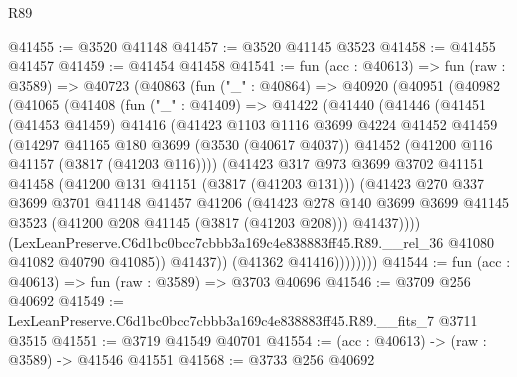 \begin{lexlean}{R89}
\begin{coremodule}
@41455 := @3520 @41148
@41457 := @3520 @41145 @3523
@41458 := @41455 @41457
@41459 := @41454 @41458
@41541 := fun (acc : @40613) =>
  fun (raw : @3589) =>
  @40723
    (@40863
      (fun ("_" : @40864) =>
      @40920
        (@40951
          (@40982
            (@41065
              (@41408
                (fun ("_" : @41409) =>
                @41422
                  (@41440
                    (@41446
                      (@41451
                        (@41453 @41459)
                        @41416
                        (@41423
                          @1103
                          @1116
                          @3699
                          @4224
                          @41452
                          @41459
                          (@14297
                            @41165
                            @180
                            @3699
                            (@3530 (@40617 @4037))
                            @41452
                            (@41200 @116 @41157 (@3817 (@41203 @116))))
                          (@41423
                            @317
                            @973
                            @3699
                            @3702
                            @41151
                            @41458
                            (@41200 @131 @41151 (@3817 (@41203 @131)))
                            (@41423
                              @270
                              @337
                              @3699
                              @3701
                              @41148
                              @41457
                              @41206
                              (@41423
                                @278
                                @140
                                @3699
                                @3699
                                @41145
                                @3523
                                (@41200 @208 @41145 (@3817 (@41203 @208)))
                                @41437))))
                        (LexLeanPreserve.C6d1bc0bcc7cbbb3a169c4e838883ff45.R89.__rel_36
                          @41080
                          @41082
                          @40790
                          @41085))
                      @41437))
                  (@41362 @41416))))))))
@41544 := fun (acc : @40613) => fun (raw : @3589) => @3703 @40696
@41546 := @3709 @256 @40692
@41549 := LexLeanPreserve.C6d1bc0bcc7cbbb3a169c4e838883ff45.R89.__fits_7 @3711 @3515
@41551 := @3719 @41549 @40701
@41554 := (acc : @40613) -> (raw : @3589) -> @41546 @41551
@41568 := @3733
    @256
    @40692

\end{coremodule}
\end{lexlean}
